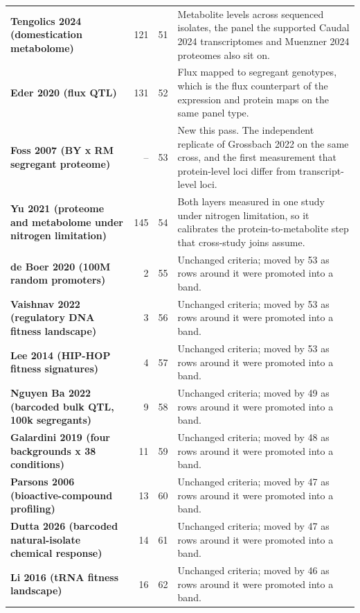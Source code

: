 \begin{longtable}{@{}L{46mm} r@{\hspace{6pt}} r@{\hspace{6pt}} L{104mm}@{}}
\addlinespace[5pt]
\textbf{Tengolics 2024 (domestication metabolome)} & 121 & 51 & Metabolite levels across sequenced isolates, the panel the supported Caudal 2024 transcriptomes and Muenzner 2024 proteomes also sit on. \\
\addlinespace[5pt]
\textbf{Eder 2020 (flux QTL)} & 131 & 52 & Flux mapped to segregant genotypes, which is the flux counterpart of the expression and protein maps on the same panel type. \\
\addlinespace[5pt]
\textbf{Foss 2007 (BY x RM segregant proteome)} & -- & 53 & New this pass. The independent replicate of Grossbach 2022 on the same cross, and the first measurement that protein-level loci differ from transcript-level loci. \\
\addlinespace[5pt]
\textbf{Yu 2021 (proteome and metabolome under nitrogen limitation)} & 145 & 54 & Both layers measured in one study under nitrogen limitation, so it calibrates the protein-to-metabolite step that cross-study joins assume. \\
\addlinespace[5pt]
\textbf{de Boer 2020 (100M random promoters)} & 2 & 55 & Unchanged criteria; moved by 53 as rows around it were promoted into a band. \\
\addlinespace[5pt]
\textbf{Vaishnav 2022 (regulatory DNA fitness landscape)} & 3 & 56 & Unchanged criteria; moved by 53 as rows around it were promoted into a band. \\
\addlinespace[5pt]
\textbf{Lee 2014 (HIP-HOP fitness signatures)} & 4 & 57 & Unchanged criteria; moved by 53 as rows around it were promoted into a band. \\
\addlinespace[5pt]
\textbf{Nguyen Ba 2022 (barcoded bulk QTL, 100k segregants)} & 9 & 58 & Unchanged criteria; moved by 49 as rows around it were promoted into a band. \\
\addlinespace[5pt]
\textbf{Galardini 2019 (four backgrounds x 38 conditions)} & 11 & 59 & Unchanged criteria; moved by 48 as rows around it were promoted into a band. \\
\addlinespace[5pt]
\textbf{Parsons 2006 (bioactive-compound profiling)} & 13 & 60 & Unchanged criteria; moved by 47 as rows around it were promoted into a band. \\
\addlinespace[5pt]
\textbf{Dutta 2026 (barcoded natural-isolate chemical response)} & 14 & 61 & Unchanged criteria; moved by 47 as rows around it were promoted into a band. \\
\addlinespace[5pt]
\textbf{Li 2016 (tRNA fitness landscape)} & 16 & 62 & Unchanged criteria; moved by 46 as rows around it were promoted into a band. \\

\end{longtable}
